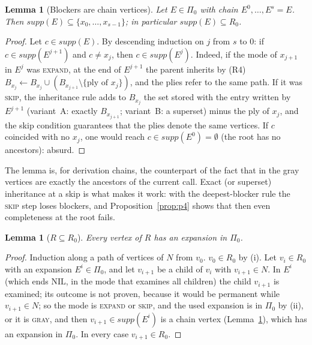\documentclass{article}
\theoremstyle{plain}
\newtheorem{lemma}[theorem]{Lemma}
\theoremstyle{definition}
\theoremstyle{remark}
\newcommand{\NIL}{\ensuremath{\mathrm{NIL}}}
\begin{document}
\begin{lemma}[Blockers are chain vertices]\label{lem:chain}
Let $E \in \Pi_0$ with chain $E^0, \dots, E^s = E$. Then $\mathit{supp}(E) \subseteq \{x_0, \dots, x_{s-1}\}$; in particular $\mathit{supp}(E) \subseteq R_0$.
\end{lemma}
\begin{proof}
Let $c \in \mathit{supp}(E)$. By descending induction on $j$ from $s$ to $0$: if $c \in \mathit{supp}(E^{j+1})$ and $c \neq x_j$, then $c \in \mathit{supp}(E^j)$. Indeed, if the mode of $x_{j+1}$ in $E^j$ was \textsc{expand}, at the end of $E^{j+1}$ the parent inherits by (R4) $B_{x_j} \gets B_{x_j} \cup (B_{x_{j+1}} \setminus \{\text{ply of } x_j\})$, and the plies refer to the same path. If it was \textsc{skip}, the inheritance rule adds to $B_{x_j}$ the set stored with the entry written by $E^{j+1}$ (variant~A: exactly $B_{x_{j+1}}$; variant~B: a superset) minus the ply of $x_j$, and the skip condition guarantees that the plies denote the same vertices. If $c$ coincided with no $x_j$, one would reach $c \in \mathit{supp}(E^0) = \emptyset$ (the root has no ancestors): absurd.
\end{proof}

The lemma is, for derivation chains, the counterpart of the fact that in \cite{romano2026} the gray vertices are exactly the ancestors of the current call. Exact (or superset) inheritance at a skip is what makes it work: with the deepest-blocker rule the \textsc{skip} step loses blockers, and Proposition~\ref{prop:p4} shows that then even completeness at the root fails.

\begin{lemma}[$R \subseteq R_0$]\label{lem:R}
Every vertex of $R$ has an expansion in $\Pi_0$.
\end{lemma}
\begin{proof}
Induction along a path of vertices of $N$ from $v_0$. $v_0 \in R_0$ by (i). Let $v_i \in R_0$ with an expansion $E^i \in \Pi_0$, and let $v_{i+1}$ be a child of $v_i$ with $v_{i+1} \in N$. In $E^i$ (which ends \NIL{}, in the mode that examines all children) the child $v_{i+1}$ is examined; its outcome is not proven, because it would be permanent while $v_{i+1} \in N$; so the mode is \textsc{expand} or \textsc{skip}, and the used expansion is in $\Pi_0$ by (ii), or it is \textsc{gray}, and then $v_{i+1} \in \mathit{supp}(E^i)$ is a chain vertex (Lemma~\ref{lem:chain}), which has an expansion in $\Pi_0$. In every case $v_{i+1} \in R_0$.
\end{proof}
\end{document}
